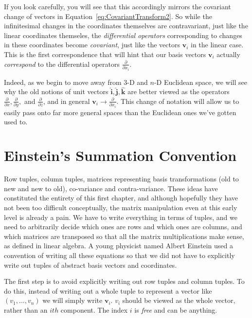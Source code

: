 \documentclass[../master.tex]{subfiles}
\begin{document}
	If you look carefully, you will see that this accordingly mirrors the covariant change of vectors in Equation~\eqref{eq:CovariantTransform2}. So while the infinitesimal changes in the coordinates themselves are contravariant, just like the linear coordinates themseles, the \emph{differential operators} corresponding to changes in these coordinates become \emph{covariant}, just like the vectors $\mathbf v_i$ in the linear case. This is the first correspondence that will hint that our basis vectors $\mathbf v_i$ actually \emph{correspond} to the differential operators $\frac{\partial}{\partial x_i}$.
	
	Indeed, as we begin to move away from 3-D and $n$-D Euclidean space, we will see why the old notions of unit vectors $\mathbf{\hat i}, \mathbf{\hat j}, \mathbf{\hat k}$ are better viewed as the operators $\frac{\partial}{\partial x}, \frac{\partial}{\partial y},$ and $ \frac{\partial}{\partial z}$, and in general $\mathbf v_i \rightarrow \frac{\partial}{\partial x_i}$. This change of notation will allow us to easily pass onto far more general spaces than the Euclidean ones we've gotten used to. 
	
	
	\section{Einstein's Summation Convention} %
	\label{sec:einstein's_summation_convention}
	
	Row tuples, column tuples, matrices representing basis transformations (old to new and new to old), co-variance and contra-variance. These ideas have constituted the entirety of this first chapter, and although hopefully they have not been too difficult conceptually, the matrix manipulation even at this early level is already a pain. We have to write everything in terms of tuples, and we need to arbitrarily decide which ones are rows and which ones are columns, and which matrices are transposed so that all the matrix multiplications make sense, as defined in linear algebra. A young physicist named Albert Einstein used a convention of writing all these equations so that we did not have to explicitly write out tuples of abstract basis vectors and coordinates.
	
	The first step is to avoid explicitly writing out row tuples and column tuples. To do this, instead of writing out a whole tuple to represent a vector like $(v_1, \dots, v_n)$ we will simply write $\mathbf v_i$. $v_i$ should be viewed as the whole vector, rather than an $ith$ component. The index $i$ is \emph{free} and can be anything. 
	
\end{document}
